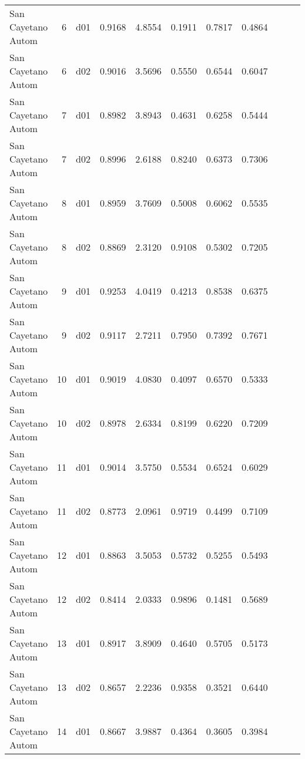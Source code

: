 \begin{landscape}
\begin{longtable}{p{2cm}rrrrrrrrrr}
     San Cayetano Autom   &          6 &     d01 &   0.9168 &  4.8554 &        0.1911 &           0.7817 &  0.4864 \\
     San Cayetano Autom   &          6 &     d02 &   0.9016 &  3.5696 &        0.5550 &           0.6544 &  0.6047 \\
     San Cayetano Autom   &          7 &     d01 &   0.8982 &  3.8943 &        0.4631 &           0.6258 &  0.5444 \\
     San Cayetano Autom   &          7 &     d02 &   0.8996 &  2.6188 &        0.8240 &           0.6373 &  0.7306 \\
     San Cayetano Autom   &          8 &     d01 &   0.8959 &  3.7609 &        0.5008 &           0.6062 &  0.5535 \\
     San Cayetano Autom   &          8 &     d02 &   0.8869 &  2.3120 &        0.9108 &           0.5302 &  0.7205 \\
     San Cayetano Autom   &          9 &     d01 &   0.9253 &  4.0419 &        0.4213 &           0.8538 &  0.6375 \\
     San Cayetano Autom   &          9 &     d02 &   0.9117 &  2.7211 &        0.7950 &           0.7392 &  0.7671 \\
     San Cayetano Autom   &         10 &     d01 &   0.9019 &  4.0830 &        0.4097 &           0.6570 &  0.5333 \\
     San Cayetano Autom   &         10 &     d02 &   0.8978 &  2.6334 &        0.8199 &           0.6220 &  0.7209 \\
     San Cayetano Autom   &         11 &     d01 &   0.9014 &  3.5750 &        0.5534 &           0.6524 &  0.6029 \\
     San Cayetano Autom   &         11 &     d02 &   0.8773 &  2.0961 &        0.9719 &           0.4499 &  0.7109 \\
     San Cayetano Autom   &         12 &     d01 &   0.8863 &  3.5053 &        0.5732 &           0.5255 &  0.5493 \\
     San Cayetano Autom   &         12 &     d02 &   0.8414 &  2.0333 &        0.9896 &           0.1481 &  0.5689 \\
     San Cayetano Autom   &         13 &     d01 &   0.8917 &  3.8909 &        0.4640 &           0.5705 &  0.5173 \\
     San Cayetano Autom   &         13 &     d02 &   0.8657 &  2.2236 &        0.9358 &           0.3521 &  0.6440 \\
     San Cayetano Autom   &         14 &     d01 &   0.8667 &  3.9887 &        0.4364 &           0.3605 &  0.3984 \\

\end{longtable}
\end{landscape}
